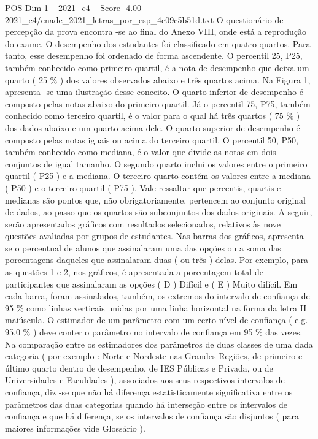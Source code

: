 \begin{textsample}{POS Dim 1 – 2021\_c4 – Score -4.00 – 2021\_c4/enade\_2021\_letras\_por\_esp\_4c09c5b51d.txt}
O questionário de percepção da prova encontra -se ao final do Anexo VIII, onde está a reprodução do exame.
O desempenho dos estudantes foi classificado em quatro quartos.
Para tanto, esse desempenho foi ordenado de forma ascendente.
O percentil 25, P25, também conhecido como primeiro quartil, é a nota de desempenho que deixa um quarto ( 25 \% ) dos valores observados abaixo e três quartos acima.
Na Figura 1, apresenta -se uma ilustração desse conceito.
O quarto inferior de desempenho é composto pelas notas abaixo do primeiro quartil.
Já o percentil 75, P75, também conhecido como terceiro quartil, é o valor para o qual há três quartos ( 75 \% ) dos dados abaixo e um quarto acima dele.
O quarto superior de desempenho é composto pelas notas iguais ou acima do terceiro quartil.
O percentil 50, P50, também conhecido como mediana, é o valor que divide as notas em dois conjuntos de igual tamanho.
O segundo quarto inclui os valores entre o primeiro quartil ( P25 ) e a mediana.
O terceiro quarto contém os valores entre a mediana ( P50 ) e o terceiro quartil ( P75 ).
Vale ressaltar que percentis, quartis e medianas são pontos que, não obrigatoriamente, pertencem ao conjunto original de dados, ao passo que os quartos são subconjuntos dos dados originais.
A seguir, serão apresentados gráficos com resultados selecionados, relativos às nove questões avaliadas por grupos de estudantes.
Nas barras dos gráficos, apresenta -se o percentual de alunos que assinalaram uma das opções ou a soma das porcentagens daqueles que assinalaram duas ( ou três ) delas.
Por exemplo, para as questões 1 e 2, nos gráficos, é apresentada a porcentagem total de participantes que assinalaram as opções ( D ) Difícil e ( E ) Muito difícil.
Em cada barra, foram assinalados, também, os extremos do intervalo de confiança de 95 \% como linhas verticais unidas por uma linha horizontal na forma da letra H maiúscula.
O estimador de um parâmetro com um certo nível de confiança ( e.g. 95,0 \% ) deve conter o parâmetro no intervalo de confiança em 95 \% das vezes.
Na comparação entre os estimadores dos parâmetros de duas classes de uma dada categoria ( por exemplo : Norte e Nordeste nas Grandes Regiões, de primeiro e último quarto dentro de desempenho, de IES Públicas e Privada, ou de Universidades e Faculdades ), associados aos seus respectivos intervalos de confiança, diz -se que não há diferença estatisticamente significativa entre os parâmetros das duas categorias quando há interseção entre os intervalos de confiança e que há diferença, se os intervalos de confiança são disjuntos ( para maiores informações vide Glossário ).

\end{textsample}
